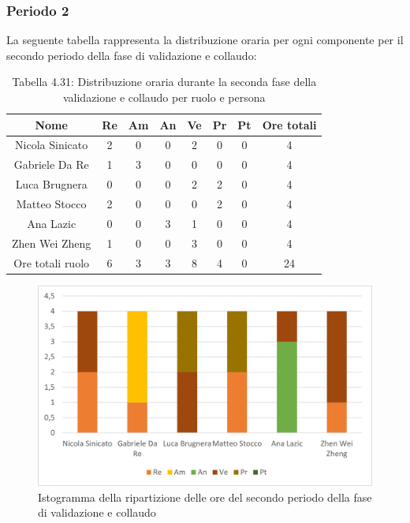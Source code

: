 \subsubsection{Periodo 2}
%
La seguente tabella rappresenta la distribuzione oraria per ogni componente per il secondo periodo della fase di validazione e collaudo:
\begin{table}[h]
	\setlength\extrarowheight{5pt}
	\centering
	\begin{tabularx}{\textwidth}{|ccccccc|c|}
		\hline
		\rowcolor{white}
		\textbf{Nome} & \textbf{Re} & \textbf{Am} & \textbf{An} & \textbf{Ve} & \textbf{Pr}& \textbf{Pt} & \textbf{Ore totali} \\
		\hline
		Nicola Sinicato &2&0&0&2&0&0&4 \\
		Gabriele Da Re &1&3&0&0&0&0&4 \\
		Luca Brugnera &0&0&0&2&2&0&4 \\
		Matteo Stocco &2&0&0&0&2&0&4 \\
		Ana Lazic &0&0&3&1&0&0&4 \\
		Zhen Wei Zheng &1&0&0&3&0&0&4 \\
		\hline
		Ore totali ruolo &6&3&3&8&4&0&24 \\
		\hline
	\end{tabularx}
	\vspace{10pt}
	\caption{Tabella 4.31: Distribuzione oraria durante la seconda fase della validazione e collaudo per ruolo e persona}
\end{table}
\begin{figure}[H]
    \centering
    \includegraphics[scale=0.6]{img/grafi preventivo/istogrammi/validazione/periodo2.png}
    \caption{Istogramma della ripartizione delle ore del secondo periodo della fase di validazione e collaudo}
\end{figure}
